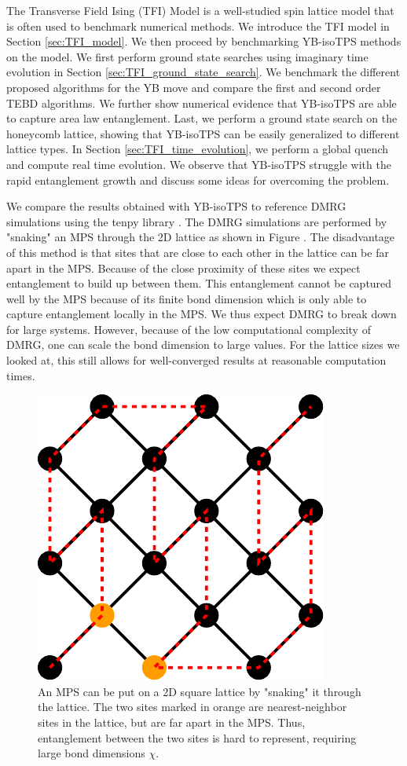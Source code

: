 The Transverse Field Ising (TFI) Model is a well-studied spin lattice model that is often used to benchmark numerical methods. We introduce the TFI model in Section \ref{sec:TFI_model}. We then proceed by benchmarking YB-isoTPS methods on the model. We first perform ground state searches using imaginary time evolution in Section \ref{sec:TFI_ground_state_search}. We benchmark the different proposed algorithms for the YB move and compare the first and second order TEBD algorithms. We further show numerical evidence that YB-isoTPS are able to capture area law entanglement. Last, we perform a ground state search on the honeycomb lattice, showing that YB-isoTPS can be easily generalized to different lattice types. In Section \ref{sec:TFI_time_evolution}, we perform a global quench and compute real time evolution. We observe that YB-isoTPS struggle with the rapid entanglement growth and discuss some ideas for overcoming the problem. \par
We compare the results obtained with YB-isoTPS to reference DMRG simulations using the tenpy library \cite{cite:tenpy}. The DMRG simulations are performed by "snaking" an MPS through the 2D lattice as shown in Figure . The disadvantage of this method is that sites that are close to each other in the lattice can be far apart in the MPS. Because of the close proximity of these sites we expect entanglement to build up between them. This entanglement cannot be captured well by the MPS because of its finite bond dimension which is only able to capture entanglement locally in the MPS. We thus expect DMRG to break down for large systems. However, because of the low computational complexity of DMRG, one can scale the bond dimension to large values. For the lattice sizes we looked at, this still allows for well-converged results at reasonable computation times.
\begin{figure}
	\centering
	\includegraphics[scale=0.6]{figures/tikz/TFI/dmrg_snaking/dmrg_snaking.pdf}
	\caption{An MPS can be put on a 2D square lattice by "snaking" it through the lattice. The two sites marked in orange are nearest-neighbor sites in the lattice, but are far apart in the MPS. Thus, entanglement between the two sites is hard to represent, requiring large bond dimensions $\chi$.}
	\label{fig:tenpy_snaking}
\end{figure}

